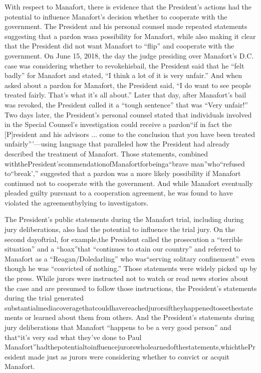With respect to Manafort, there is evidence that the President's actions had the potential to influence Manafort's decision whether to cooperate with the government. The President and his personal counsel made repeated statements suggesting that a pardon wasa possibility for Manafort, while also making it clear that the President did not want Manafort to “flip” and cooperate with the government. On June 15, 2018, the day the judge presiding over Manafort's D.C. case was considering whether to revokehisbail, the President said that he “felt badly” for Manafort and stated, “I think a lot of it is very unfair.” And when asked about a pardon for Manafort, the President said, “I do want to see people treated fairly. That's what it's all about.” Later that day, after Manafort's bail was revoked, the President called it a “tough sentence” that was “Very unfair!” Two days later, the President's personal counsel stated that individuals involved in the Special Counsel's investigation could receive a pardon“if in fact the [P]resident and his advisors ... come to the conclusion that you have been treated unfairly”'—using language that paralleled how the President had already described the treatment of Manafort. Those statements, combined withthePresident'scommendationofManafortforbeinga“brave man”who“refused to“break',” suggested that a pardon was a more likely possibility if Manafort continued not to cooperate with the government. And while Manafort eventually pleaded guilty pursuant to a cooperation agreement, he was found to have violated the agreementbylying to investigators.

The President's public statements during the Manafort trial, including during jury deliberations, also had the potential to influence the trial jury. On the second dayoftrial, for example,the President called the prosecution a “terrible situation” and a “hoax”that “continues to stain our country” and referred to Manafort as a “Reagan/Doledarling” who was“serving solitary confinement” even though he was “convicted of nothing.” Those statements were widely picked up by the press. While jurors were instructed not to watch or read news stories about the case and are presumed to follow those instructions, the President's statements during the trial generated substantialmediacoveragethatcouldhavereachedjurorsiftheyhappenedtoseethestatements or learned about them from others. And the President's statements during jury deliberations that Manafort “happens to be a very good person” and that“it's very sad what they've done to Paul Manafort”hadthepotentialtoinfluencejurorswholearnedofthestatements,whichthePresident made just as jurors were considering whether to convict or acquit Manafort.

